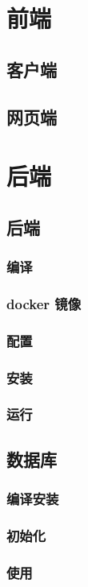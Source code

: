 \documentclass[UTF8]{book}
\begin{document}
\maketitle
{}
\tableofcontents
\part{前端}
\chapter{客户端}
\chapter{网页端}
\part{后端}
\chapter{后端}
\section{编译}
\section{docker 镜像}
\section{配置}
\section{安装}
\section{运行}
\chapter{数据库}
\section{编译安装}
\section{初始化}
\section{使用}
\end{document}
